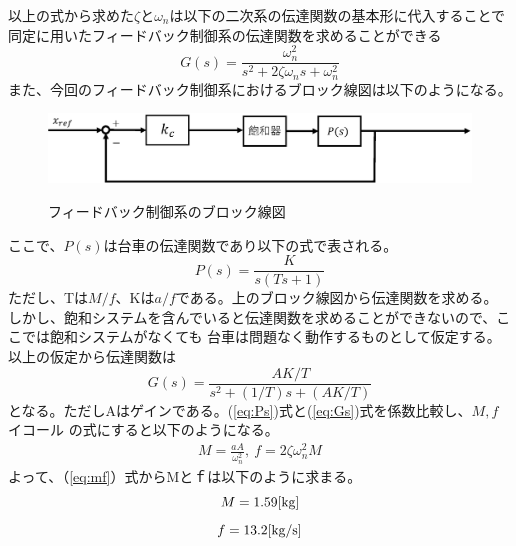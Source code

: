 		以上の式から求めた$\zeta$と$\omega_{n}$は以下の二次系の伝達関数の基本形に代入することで
		同定に用いたフィードバック制御系の伝達関数を求めることができる
		\begin{equation}
			G(s) = \frac{\omega_{n}^{2}}{s^{2}+2\zeta\omega_{n}s + \omega_{n}^{2}}
		\end{equation}
		また、今回のフィードバック制御系におけるブロック線図は以下のようになる。
		\begin{figure}[H]
			\centering
			\includegraphics[width=1.0\linewidth]{gazo/FeedBackCart.eps}\\
			\caption{フィードバック制御系のブロック線図}
			\label{image:FeedBackCart}
		\end{figure}
		ここで、$P(s)$は台車の伝達関数であり以下の式で表される。
		\begin{equation}
			P(s)=\frac{K}{s(Ts+1)}
			\label{eq:Ps}
		\end{equation}
		ただし、Tは$M/f$、Kは$a/f$である。上のブロック線図から伝達関数を求める。
		しかし、飽和システムを含んでいると伝達関数を求めることができないので、ここでは飽和システムがなくても
		台車は問題なく動作するものとして仮定する。以上の仮定から伝達関数は
		\begin{equation}
			G(s) = \frac{AK/T}{s^{2}+(1/T)s+(AK/T)}
			\label{eq:Gs}
		\end{equation}
		となる。ただしAはゲインである。(\ref{eq:Ps})式と(\ref{eq:Gs})式を係数比較し、$M,f$イコール
		の式にすると以下のようになる。
		\begin{equation}
			\left.
			\begin{array}{l}
				\displaystyle M=\frac{aA}{\omega_{n}^{2}} , \ f=2\zeta\omega_{n}^{2}M
			\end{array}
			\right.
			\label{eq:mf}
		\end{equation}
		よって、（\ref{eq:mf}）式からMとｆは以下のように求まる。
		\[
			M=1.59[\rm{kg}]
		\]
		\[
			f=13.2[\rm{kg/s}]
		\]
		
